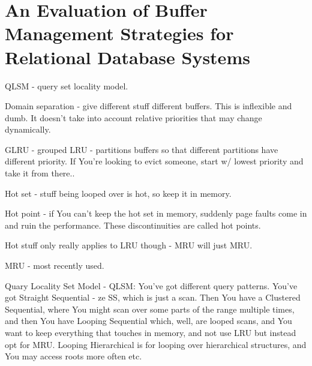 \documentclass{article}
\begin{document}
		
		
		
		
		
			
			
			
			
			

	
				
				
				
				
				
				
				
				
				
				
                                                                                                                                   		
			
			
			
			
			
			
\newpage\phantom{asd}
\newpage
\section{An Evaluation of Buffer Management Strategies for
Relational Database Systems}

	QLSM - query set locality model.

	Domain separation - give different stuff different buffers. This is inflexible and dumb. It doesn't take into account relative priorities that may change dynamically.
	
	GLRU - grouped LRU - partitions buffers so that different partitions have different priority. If You're looking to evict someone, start w/ lowest priority and take it from there..
	
	Hot set - stuff being looped over is hot, so keep it in memory.
	
	Hot point - if You can't keep the hot set in memory, suddenly page faults come in and ruin the performance. These discontinuities are called hot points.
	
	Hot stuff only really applies to LRU though - MRU will just MRU.
	
	MRU - most recently used.
	
	Quary Locality Set Model - QLSM: You've got different query patterns. You've got Straight Sequential - ze SS, which is just a scan. Then You have a Clustered Sequential, where You might scan over some parts of the range multiple times, and then You have Looping Sequential which, well, are looped scans, and You want to keep everything that touches in memory, and not use LRU but instead opt for MRU. Looping Hierarchical is for looping over hierarchical structures, and You may access roots more often etc.
	
\end{document}
